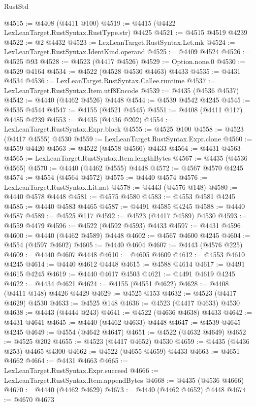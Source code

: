 \begin{lexlean}{RustStd}
\begin{coremodule}
@4515 := @4408 (@4411 @100)
@4519 := @4415 (@4422 LexLeanTarget.RustSyntax.RustType.str) @4425
@4521 := @4515 @4519 @4239
@4522 := @2 @4432
@4523 := LexLeanTarget.RustSyntax.Let.mk
@4524 := LexLeanTarget.RustSyntax.IdentKind.operand
@4525 := @4409 @4524
@4526 := @4525 @93
@4528 := @4523 (@4417 @4526)
@4529 := Option.none.{0}
@4530 := @4529 @4164
@4534 := @4522 (@4528 @4530 @4463) @4433
@4535 := @4431 @4534
@4536 := LexLeanTarget.RustSyntax.Callee.runtime
@4537 := LexLeanTarget.RustSyntax.Item.utf8Encode
@4539 := @4435 (@4536 @4537)
@4542 := @4440 (@4462 @4526) @4448
@4544 := @4539 @4542 @4245
@4545 := @4535 @4544
@4547 := @4155 (@4521 @4545)
@4551 := @4408 (@4411 @117) @4485 @4239
@4553 := @4435 (@4436 @202)
@4554 := LexLeanTarget.RustSyntax.Expr.block
@4555 := @4525 @100
@4558 := @4523 (@4417 @4555) @4530
@4559 := LexLeanTarget.RustSyntax.Expr.clone
@4560 := @4559 @4420
@4563 := @4522 (@4558 @4560) @4433
@4564 := @4431 @4563
@4565 := LexLeanTarget.RustSyntax.Item.lengthBytes
@4567 := @4435 (@4536 @4565)
@4570 := @4440 (@4462 @4555) @4448
@4572 := @4567 @4570 @4245
@4574 := @4554 (@4564 @4572)
@4575 := @4440 @4574
@4576 := LexLeanTarget.RustSyntax.Lit.nat
@4578 := @4443 (@4576 @148)
@4580 := @4440 @4578 @4448
@4581 := @4575 @4580
@4583 := @4553 @4581 @4245
@4585 := @4440 @4583 @4465
@4587 := @4491 @4585 @4245
@4588 := @4440 @4587
@4589 := @4525 @117
@4592 := @4523 (@4417 @4589) @4530
@4593 := @4559 @4479
@4596 := @4522 (@4592 @4593) @4433
@4597 := @4431 @4596
@4600 := @4440 (@4462 @4589) @4448
@4602 := @4567 @4600 @4245
@4604 := @4554 (@4597 @4602)
@4605 := @4440 @4604
@4607 := @4443 (@4576 @225)
@4609 := @4440 @4607 @4448
@4610 := @4605 @4609
@4612 := @4553 @4610 @4245
@4614 := @4440 @4612 @4448
@4615 := @4588 @4614
@4617 := @4491 @4615 @4245
@4619 := @4440 @4617 @4503
@4621 := @4491 @4619 @4245
@4622 := @4434 @4621
@4624 := @4155 (@4551 @4622)
@4628 := @4408 (@4411 @148) @4426 @4429
@4629 := @4525 @153
@4632 := @4523 (@4417 @4629) @4530
@4633 := @4525 @148
@4636 := @4523 (@4417 @4633) @4530
@4638 := @4443 (@4444 @243)
@4641 := @4522 (@4636 @4638) @4433
@4642 := @4431 @4641
@4645 := @4440 (@4462 @4633) @4448
@4647 := @4539 @4645 @4245
@4649 := @4554 (@4642 @4647)
@4651 := @4522 (@4632 @4649)
@4652 := @4525 @202
@4655 := @4523 (@4417 @4652) @4530
@4659 := @4435 (@4436 @253) @4465 @4300
@4662 := @4522 (@4655 @4659) @4433
@4663 := @4651 @4662
@4664 := @4431 @4663
@4665 := LexLeanTarget.RustSyntax.Expr.succeed
@4666 := LexLeanTarget.RustSyntax.Item.appendBytes
@4668 := @4435 (@4536 @4666)
@4670 := @4440 (@4462 @4629)
@4673 := @4440 (@4462 @4652) @4448
@4674 := @4670 @4673

\end{coremodule}
\end{lexlean}
